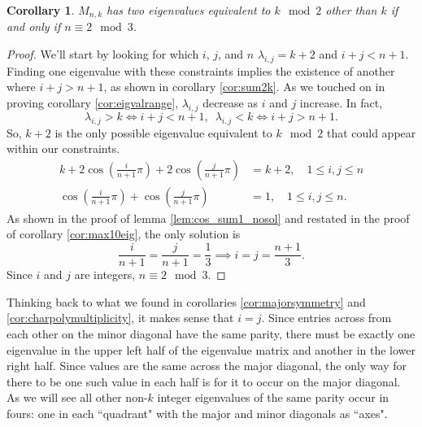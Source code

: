 \documentclass[12pt]{article}
\newtheorem{corollary}{Corollary}
\begin{document}
	\begin{corollary}\label{cor:2mod3}
		$M_{n,k}$ has two eigenvalues equivalent to $k \mod 2$ other than $k$ if and
		only if $n \equiv 2 \mod 3$.
	\end{corollary}
	\begin{proof}
		We'll start by looking for which $i$, $j$, and $n$ $\lambda_{i,j} = k+2$ and
		$i+j<n+1$. 
		Finding one eigenvalue with these constraints implies the existence of another
		where $i+j>n+1$, as shown in corollary \ref{cor:sum2k}.
		As we touched on in proving corollary \ref{cor:eigvalrange}, $\lambda_{i,j}$
		decrease as $i$ and $j$ increase.
		In fact,
		\begin{equation*}
		\lambda_{i,j} > k \Leftrightarrow i+j < n+1, \hspace{6pt} \lambda_{i,j} < k
		\Leftrightarrow i+j > n+1.
		\end{equation*}
		So, $k+2$ is the only possible eigenvalue equivalent to $k \mod 2$ that could
		appear within our constraints.
		\begin{align*}
		k + 2\cos{\left(\frac{i}{n+1}\pi\right)} +
		2\cos{\left(\frac{j}{n+1}\pi\right)} &= k + 2, \hspace{12pt} 1 \leq i,j \leq n
		\\
		\cos{\left(\frac{i}{n+1}\pi\right)} + \cos{\left(\frac{j}{n+1}\pi\right)} &=
		1, \hspace{12pt} 1 \leq i,j \leq n.
		\end{align*}
		As shown in the proof of lemma \ref{lem:cos_sum1_nosol} and restated in the
		proof of corollary \ref{cor:max10eig}, the only solution is 
		\begin{equation*}
		\frac{i}{n+1} = \frac{j}{n+1} = \frac{1}{3} \implies i = j = \frac{n+1}{3}.
		\end{equation*}
		Since $i$ and $j$ are integers, $n \equiv 2 \mod 3$.
	\end{proof}
	Thinking back to what we found in corollaries \ref{cor:majorsymmetry} and
	\ref{cor:charpolymultiplicity}, it makes sense that $i=j$.
	Since entries across from each other on the minor diagonal have the same
	parity, there must be exactly one eigenvalue in the upper left half of the
	eigenvalue matrix and another in the lower right half.
	Since values are the same across the major diagonal, the only way for there to
	be one such value in each half is for it to occur on the major diagonal.
	As we will see all other non-$k$ integer eigenvalues of the same parity occur
	in fours: one in each ``quadrant" with the major and minor diagonals as ``axes".
	
\end{document}
